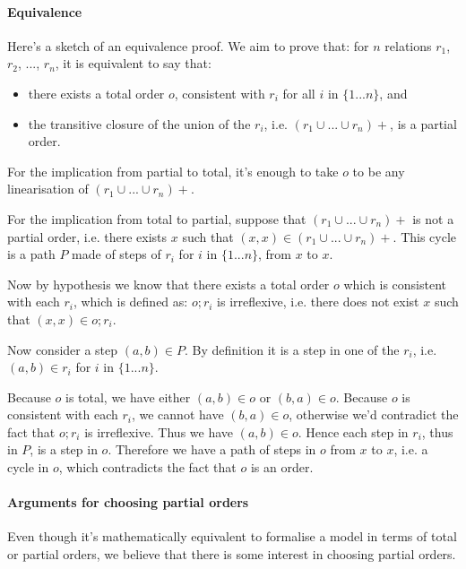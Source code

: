 \documentclass[a4paper]{article}
\begin{document}
{\color{blue}

\paragraph{Equivalence}

Here's a sketch of an equivalence proof. We aim to prove that: for $n$
relations $r_1$, $r_2$, ..., $r_n$, it is equivalent to say that:
\begin{itemize}
\item there exists a total order $o$, consistent with $r_i$ for all $i$ in $\{1
...  n\}$, and
\item the transitive closure of the union of the $r_i$, i.e. $(r_1 \cup ...
\cup r_n)+$, is a partial order.
\end{itemize}

For the implication from partial to total, it's enough to take $o$ to be any linearisation of $(r_1 \cup ... \cup r_n)+$.

For the implication from total to partial, suppose that $(r_1 \cup ... \cup
r_n)+$ is not a partial order, i.e. there exists $x$ such that $(x,x) \in (r_1
\cup ... \cup r_n)+$. This cycle is a path $P$ made of steps of $r_i$ for $i$
in $\{1 ... n\}$, from $x$ to $x$.

Now by hypothesis we know that there exists a total order $o$ which is
consistent with each $r_i$, which is defined as: $o;r_i$ is irreflexive, i.e.
there does not exist $x$ such that $(x,x) \in o;r_i$.

Now consider a step $(a,b) \in P$. By definition it is a step in one of the
$r_i$, i.e. $(a,b) \in r_i$ for $i$ in $\{1 ... n\}$.

Because $o$ is total, we have either $(a,b) \in o$ or $(b,a) \in o$. Because
$o$ is consistent with each $r_i$, we cannot have $(b,a) \in o$, otherwise we'd
contradict the fact that $o;r_i$ is irreflexive. Thus we have $(a,b) \in o$.
Hence each step in $r_i$, thus in $P$, is a step in $o$. Therefore we have a
path of steps in $o$ from $x$ to $x$, i.e. a cycle in $o$, which contradicts
the fact that $o$ is an order.  

\paragraph{Arguments for choosing partial orders}

Even though it's mathematically equivalent to formalise a model in terms of
total or partial orders, we believe that there is some interest in choosing
partial orders. 

}
\end{document}
